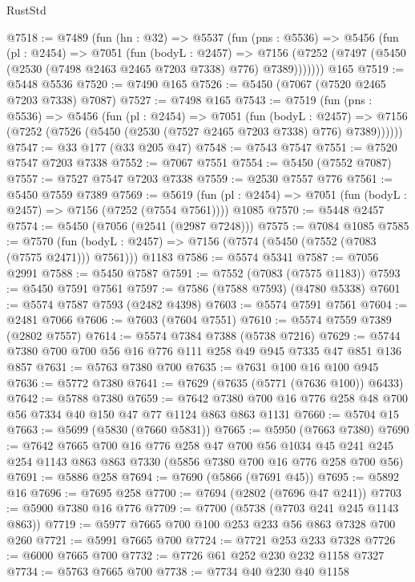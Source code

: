 \begin{lexlean}{RustStd}
\begin{coremodule}
@7518 := @7489
    (fun (hn : @32) =>
    @5537
      (fun (pns : @5536) =>
      @5456
        (fun (pl : @2454) =>
        @7051
          (fun (bodyL : @2457) =>
          @7156 (@7252 (@7497 (@5450 (@2530 (@7498 @2463 @2465 @7203 @7338) @776) @7389)))))))
    @165
@7519 := @5448 @5536
@7520 := @7490 @165
@7526 := @5450 (@7067 (@7520 @2465 @7203 @7338) @7087)
@7527 := @7498 @165
@7543 := @7519
    (fun (pns : @5536) =>
    @5456
      (fun (pl : @2454) =>
      @7051
        (fun (bodyL : @2457) =>
        @7156 (@7252 (@7526 (@5450 (@2530 (@7527 @2465 @7203 @7338) @776) @7389))))))
@7547 := @33 @177 (@33 @205 @47)
@7548 := @7543 @7547
@7551 := @7520 @7547 @7203 @7338
@7552 := @7067 @7551
@7554 := @5450 (@7552 @7087)
@7557 := @7527 @7547 @7203 @7338
@7559 := @2530 @7557 @776
@7561 := @5450 @7559 @7389
@7569 := @5619
    (fun (pl : @2454) => @7051 (fun (bodyL : @2457) => @7156 (@7252 (@7554 @7561))))
    @1085
@7570 := @5448 @2457
@7574 := @5450 (@7056 (@2541 (@2987 @7248)))
@7575 := @7084 @1085
@7585 := @7570
    (fun (bodyL : @2457) => @7156 (@7574 (@5450 (@7552 (@7083 (@7575 @2471))) @7561)))
    @1183
@7586 := @5574 @5341
@7587 := @7056 @2991
@7588 := @5450 @7587
@7591 := @7552 (@7083 (@7575 @1183))
@7593 := @5450 @7591 @7561
@7597 := @7586 (@7588 @7593) (@4780 @5338)
@7601 := @5574 @7587 @7593 (@2482 @4398)
@7603 := @5574 @7591 @7561
@7604 := @2481 @7066
@7606 := @7603 (@7604 @7551)
@7610 := @5574 @7559 @7389 (@2802 @7557)
@7614 := @5574 @7384 @7388 (@5738 @7216)
@7629 := @5744 @7380 @700 @700 @56 @16 @776 @111 @258 @49 @945 @7335 @47 @851 @136 @857
@7631 := @5763 @7380 @700
@7635 := @7631 @100 @16 @100 @945
@7636 := @5772 @7380
@7641 := @7629 (@7635 (@5771 (@7636 @100)) @6433)
@7642 := @5788 @7380
@7659 := @7642 @7380 @700 @16 @776 @258 @48 @700 @56 @7334 @40 @150 @47 @77 @1124 @863 @863 @1131
@7660 := @5704 @15
@7663 := @5699 (@5830 (@7660 @5831))
@7665 := @5950 (@7663 @7380)
@7690 := @7642
    @7665
    @700
    @16
    @776
    @258
    @47
    @700
    @56
    @1034
    @45
    @241
    @245
    @254
    @1143
    @863
    @863
    @7330
    (@5856 @7380 @700 @16 @776 @258 @700 @56)
@7691 := @5886 @258
@7694 := @7690 (@5866 (@7691 @45))
@7695 := @5892 @16
@7696 := @7695 @258
@7700 := @7694 (@2802 (@7696 @47 @241))
@7703 := @5900 @7380 @16 @776
@7709 := @7700 (@5738 (@7703 @241 @245 @1143 @863))
@7719 := @5977 @7665 @700 @100 @253 @233 @56 @863 @7328 @700 @260
@7721 := @5991 @7665 @700
@7724 := @7721 @253 @233 @7328
@7726 := @6000 @7665 @700
@7732 := @7726 @61 @252 @230 @232 @1158 @7327
@7734 := @5763 @7665 @700
@7738 := @7734 @40 @230 @40 @1158

\end{coremodule}
\end{lexlean}
